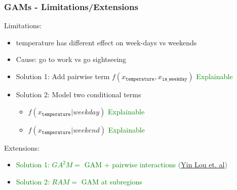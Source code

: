 \documentclass{beamer}
\begin{document}
\begin{frame}
  \frametitle{GAMs - Limitations/Extensions}

  Limitations:
  \begin{itemize}
  \item<2-> temperature has different effect on week-days vs weekends
  \item<3-> Cause: go to work vs go sightseeing
  \item<4-> Solution 1: Add pairwise term \(f(x_{\mathtt{temperature}}, x_{\mathtt{is\_weekday}})\)  {\textcolor{green}{Explainable}}
  \item<5-> Solution 2: Model two conditional terms
    \begin{itemize}
    \item<5-> \(f(x_{\mathtt{temperature}} | weekday )\)  {\textcolor{green}{Explainable}}
    \item<5-> \(f(x_{\mathtt{temperature}} | weekend )\)  {\textcolor{green}{Explainable}}
    \end{itemize}
  \end{itemize}

  \noindent\makebox[\linewidth]{\rule{\paperwidth}{0.4pt}}
  Extensions:
  \begin{itemize}
  \item<6-> \textcolor<8>{green}{Solution 1: \(GA^2M = \) GAM + pairwise interactions (\href{https://www.cs.cornell.edu/~yinlou/papers/lou-kdd13.pdf}{Yin Lou et. al})}
  \item<7-> \textcolor<8>{green}{Solution 2: \(RAM = \) GAM at subregions}
  \end{itemize}

\end{frame}
\end{document}
